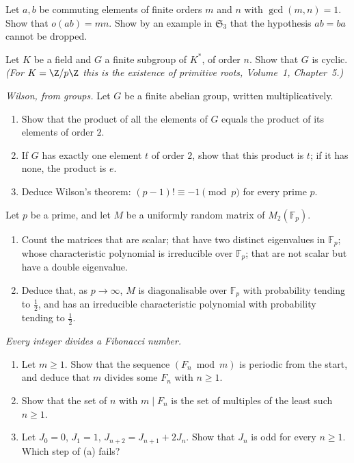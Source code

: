 \begin{exercise}[$\star\star$]\label{ex:prodorder}
Let $a,b$ be commuting elements of finite orders $m$ and $n$ with $\gcd(m,n)=1$. Show that $o(ab)=mn$. Show by an example in $\mathfrak S_3$ that the hypothesis $ab=ba$ cannot be dropped.
\end{exercise}

\begin{exercise}[$\star\star\star$]\label{ex:fieldcyclic}
Let $K$ be a field and $G$ a finite subgroup of $K^*$, of order $n$. Show that $G$ is cyclic. \emph{(For $K=\Z/p\Z$ this is the existence of primitive roots, Volume~1, Chapter~5.)}
\end{exercise}

\begin{exercise}[$\star\star\star$]\label{ex:wilson}
\emph{Wilson, from groups.} Let $G$ be a finite abelian group, written multiplicatively.
\begin{enumerate}[label=(\alph*)]
\item Show that the product of all the elements of $G$ equals the product of its elements of order $2$.
\item If $G$ has exactly one element $t$ of order $2$, show that this product is $t$; if it has none, the product is $e$.
\item Deduce Wilson's theorem: $(p-1)!\equiv-1\pmod p$ for every prime $p$.
\end{enumerate}
\end{exercise}

\begin{exercise}[$\star\star$]\label{pb:matrices2}
Let $p$ be a prime, and let $M$ be a uniformly random matrix of $M_2(\mathbb F_p)$.
\begin{enumerate}[label=(\alph*)]
\item Count the matrices that are scalar; that have two distinct eigenvalues in $\mathbb F_p$; whose characteristic polynomial
is irreducible over $\mathbb F_p$; that are not scalar but have a double eigenvalue.
\item Deduce that, as $p\to\infty$, $M$ is diagonalisable over $\mathbb F_p$ with probability tending to $\frac12$, and has an
irreducible characteristic polynomial with probability tending to $\frac12$.
\end{enumerate}
\end{exercise}

\begin{exercise}[$\star$]\label{pb:fibdivides}
\emph{Every integer divides a Fibonacci number.}
\begin{enumerate}[label=(\alph*)]
\item Let $m\ge1$. Show that the sequence $(F_n\bmod m)$ is periodic from the start, and deduce that $m$ divides some $F_n$ with
$n\ge1$.
\item Show that the set of $n$ with $m\mid F_n$ is the set of multiples of the least such $n\ge1$.
\item Let $J_0=0$, $J_1=1$, $J_{n+2}=J_{n+1}+2J_n$. Show that $J_n$ is odd for every $n\ge1$. Which step of (a) fails?
\end{enumerate}
\end{exercise}

